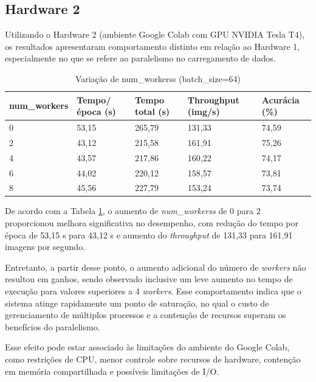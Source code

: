 \documentclass[a4paper,11pt]{article}
\begin{document}
 
\subsection{Hardware 2}

Utilizando o Hardware 2 (ambiente Google Colab com GPU NVIDIA Tesla T4), os resultados apresentaram comportamento distinto em relação ao Hardware 1, especialmente no que se refere ao paralelismo no carregamento de dados.

\begin{table}[H]
\centering
\begin{tabular}{|l|l|l|l|l|}
\hline
num\_workers & Tempo/época (s) & Tempo total (s) & Throughput (img/s) & Acurácia (\%) \\ \hline
0           & 53,15           & 265,79          & 131,33             & 74,59         \\ \hline
2           & 43,12           & 215,58          & 161,91             & 75,26         \\ \hline
4           & 43,57           & 217,86          & 160,22             & 74,17         \\ \hline
6           & 44,02           & 220,12          & 158,57             & 73,81         \\ \hline
8           & 45,56           & 227,79          & 153,24             & 73,74         \\ \hline
\end{tabular}
\caption{Variação de num\_workerss (batch\_size=64)}
\label{tab:num_workersv}
\end{table}

De acordo com a Tabela \ref{tab:num_workersv}, o aumento de \textit{num\_workerss} de 0 para 2 proporcionou melhora significativa no desempenho, com redução do tempo por época de 53,15 s para 43,12 s e aumento do \textit{throughput} de 131,33 para 161,91 imagens por segundo.

Entretanto, a partir desse ponto, o aumento adicional do número de \textit{workers} não resultou em ganhos, sendo observado inclusive um leve aumento no tempo de execução para valores superiores a 4 \textit{workers}. Esse comportamento indica que o sistema atinge rapidamente um ponto de saturação, no qual o custo de gerenciamento de múltiplos processos e a contenção de recursos superam os benefícios do paralelismo.

Esse efeito pode estar associado às limitações do ambiente do Google Colab, como restrições de CPU, menor controle sobre recursos de hardware, contenção em memória compartilhada e possíveis limitações de I/O.
\end{document}
